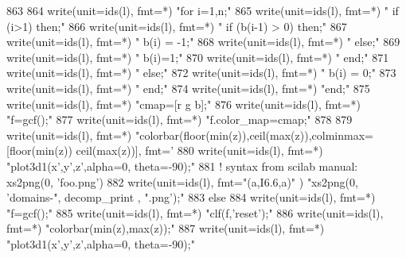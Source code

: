 \begin{DoxyCode}
{863 
864           \textcolor{keyword}{write}(unit=ids(l), fmt=*) \textcolor{stringliteral}{"for i=1,n;"}
865           \textcolor{keyword}{write}(unit=ids(l), fmt=*) \textcolor{stringliteral}{"    if (i>1) then;"}
866           \textcolor{keyword}{write}(unit=ids(l), fmt=*) \textcolor{stringliteral}{"        if (b(i-1) > 0) then;"}
867           \textcolor{keyword}{write}(unit=ids(l), fmt=*) \textcolor{stringliteral}{"            b(i) = -1;"}
868           \textcolor{keyword}{write}(unit=ids(l), fmt=*) \textcolor{stringliteral}{"        else;"}
869           \textcolor{keyword}{write}(unit=ids(l), fmt=*) \textcolor{stringliteral}{"            b(i)=1;"}
870           \textcolor{keyword}{write}(unit=ids(l), fmt=*) \textcolor{stringliteral}{"        end;"}
871           \textcolor{keyword}{write}(unit=ids(l), fmt=*) \textcolor{stringliteral}{"    else;"}
872           \textcolor{keyword}{write}(unit=ids(l), fmt=*) \textcolor{stringliteral}{"        b(i) = 0;"}
873           \textcolor{keyword}{write}(unit=ids(l), fmt=*) \textcolor{stringliteral}{"    end;"}
874           \textcolor{keyword}{write}(unit=ids(l), fmt=*) \textcolor{stringliteral}{"end;"}
875           \textcolor{keyword}{write}(unit=ids(l), fmt=*) \textcolor{stringliteral}{"cmap=[r g b];"}
876           \textcolor{keyword}{write}(unit=ids(l), fmt=*) \textcolor{stringliteral}{"f=gcf();"}
877           \textcolor{keyword}{write}(unit=ids(l), fmt=*) \textcolor{stringliteral}{"f.color\_map=cmap;"}
878 
879           \textcolor{keyword}{write}(unit=ids(l), fmt=*) \textcolor{stringliteral}{"colorbar(floor(min(z)),ceil(max(z)),colminmax=[floor(min(z))
       ceil(max(z))], fmt='%
880           \textcolor{keyword}{write}(unit=ids(l), fmt=*) \textcolor{stringliteral}{"plot3d1(x',y',z',alpha=0, theta=-90);"}
881           \textcolor{comment}{! syntax from scilab manual:  xs2png(0, 'foo.png')}
882           \textcolor{keyword}{write}(unit=ids(l), fmt=\textcolor{stringliteral}{"(a,I6.6,a)"} ) \textcolor{stringliteral}{"xs2png(0, 'domains-"}, decomp\_print\textcolor{comment}{ , }\textcolor{stringliteral}{".png');"}\textcolor{comment}{ }
883 \textcolor{comment}{        }\textcolor{keywordflow}{else}
884           \textcolor{keyword}{write}(unit=ids(l), fmt=*) \textcolor{stringliteral}{"f=gcf();"}
885           \textcolor{keyword}{write}(unit=ids(l), fmt=*) \textcolor{stringliteral}{"clf(f,'reset');"}
886           \textcolor{keyword}{write}(unit=ids(l), fmt=*) \textcolor{stringliteral}{"colorbar(min(z),max(z));"}
887           \textcolor{keyword}{write}(unit=ids(l), fmt=*) \textcolor{stringliteral}{"plot3d1(x',y',z',alpha=0, theta=-90);"}
}}
\end{DoxyCode}
